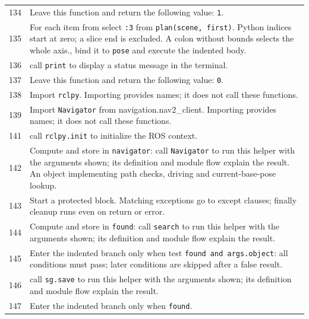 \documentclass[11pt,a4paper]{book}
\begin{document}
\begin{longtable}{r p{}}
134 & Leave this function and return the following value: \texttt{1}. \\

135 & For each item from select \texttt{:3} from \texttt{plan(scene, first)}. Python indices start at zero; a slice end is excluded. A colon without bounds selects the whole axis., bind it to \texttt{pose} and execute the indented body. \\

136 & call \texttt{print} to display a status message in the terminal. \\

137 & Leave this function and return the following value: \texttt{0}. \\

138 & Import \texttt{rclpy}. Importing provides names; it does not call these functions. \\

139 & Import \texttt{Navigator} from navigation.nav2\_client. Importing provides names; it does not call these functions. \\

141 & call \texttt{rclpy.init} to initialize the ROS context. \\

142 & Compute and store in \texttt{navigator}: call \texttt{Navigator} to run this helper with the arguments shown; its definition and module flow explain the result. An object implementing path checks, driving and current-base-pose lookup. \\

143 & Start a protected block. Matching exceptions go to except clauses; finally cleanup runs even on return or error. \\

144 & Compute and store in \texttt{found}: call \texttt{search} to run this helper with the arguments shown; its definition and module flow explain the result.  \\

145 & Enter the indented branch only when test \texttt{found and args.object}: all conditions must pass; later conditions are skipped after a false result. \\

146 & call \texttt{sg.save} to run this helper with the arguments shown; its definition and module flow explain the result. \\

147 & Enter the indented branch only when \texttt{found}. \\


\end{longtable}
\end{document}
